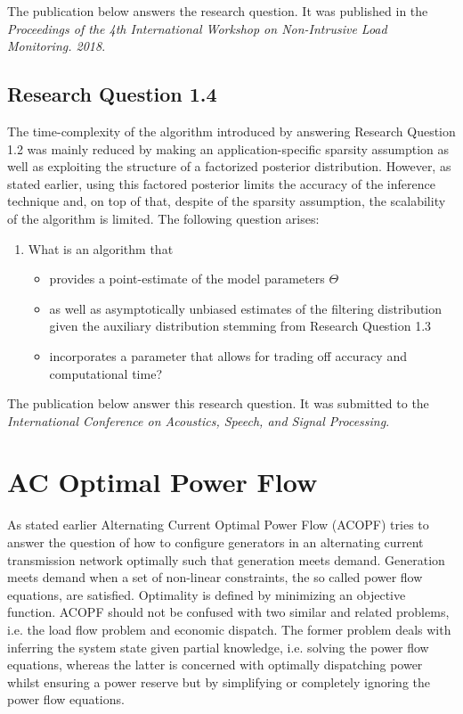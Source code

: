 \documentclass[11pt]{cmuthesis} %
\begin{document}
The publication below answers the research question. It was published in the \emph{Proceedings of the 4th International Workshop on Non-Intrusive Load Monitoring. 2018}.



\newpage
\section{Research Question 1.4}

The time-complexity of the algorithm introduced by answering Research Question 1.2 was mainly reduced by making an application-specific sparsity assumption as well as exploiting the structure of a factorized posterior distribution. However, as stated earlier, using this factored posterior limits the accuracy of the inference technique and, on top of that, despite of the sparsity assumption, the scalability of the algorithm is limited. The following question arises:

\begin{enumerate}
\item What is an algorithm that
\begin{itemize}
    \item provides a point-estimate of the model parameters $\Theta$
    \item as well as asymptotically unbiased estimates of the filtering distribution given the auxiliary distribution stemming from Research Question 1.3
    \item incorporates a parameter that allows for trading off accuracy and computational time?
\end{itemize}
\end{enumerate}

The publication below answer this research question. It was submitted to the \emph{International Conference on Acoustics, Speech, and Signal Processing}.




\chapter{AC Optimal Power Flow}

As stated earlier Alternating Current Optimal Power Flow (ACOPF) tries to answer the question of how to configure generators in an alternating current transmission network optimally such that generation meets demand. Generation meets demand when a set of non-linear constraints, the so called power flow equations, are satisfied. Optimality is defined by minimizing an objective function. ACOPF should not be confused with two similar and related problems, i.e. the load flow problem and economic dispatch. The former problem deals with inferring the system state given partial knowledge, i.e. solving the power flow equations, whereas the latter is concerned with optimally dispatching power whilst ensuring a power reserve but by simplifying or completely ignoring the power flow equations.
\end{document}
